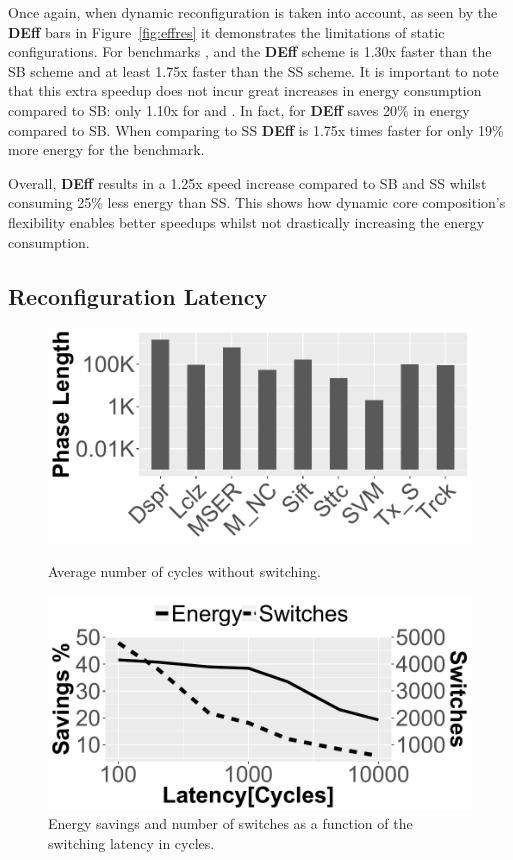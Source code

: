 Once again, when dynamic reconfiguration is taken into account, as seen by the \textbf{DEff} bars in Figure~\ref{fig:effres} it demonstrates the limitations of static configurations.
For benchmarks ,  and  the \textbf{DEff} scheme is 1.30x faster than the SB scheme and at least 1.75x faster than the SS scheme.
It is important to note that this extra speedup does not incur great increases in energy consumption compared to SB: only 1.10x for  and .
In fact, for  \textbf{DEff} saves 20\% in energy compared to SB.
When comparing to SS \textbf{DEff} is 1.75x times faster for only 19\% more energy for the  benchmark.

Overall, \textbf{DEff} results in a 1.25x speed increase compared to SB and SS whilst consuming 25\% less energy than SS.
This shows how dynamic core composition's flexibility enables better speedups whilst not drastically increasing the energy consumption.

\subsection{Reconfiguration Latency} \label{sec:reconfoverhead}

\begin{figure}[t]
	\begin{minipage}{.5\textwidth}
	\includegraphics[width=.9\linewidth]{cases-paper/graphics/Exploration/condensed_clust.pdf}
    \caption{Average number of cycles without switching.}
    \label{fig:avlen}
	\end{minipage}%
	\begin{minipage}{.5\textwidth}
	\hfill
	\includegraphics[width=.9\linewidth]{cases-paper/graphics/Exploration/latency_2.pdf}
    \caption{Energy savings and number of switches as a function of the switching latency in cycles.}
    \label{fig:enlatency}
\end{minipage}
\vspace{5mm}
\end{figure}

